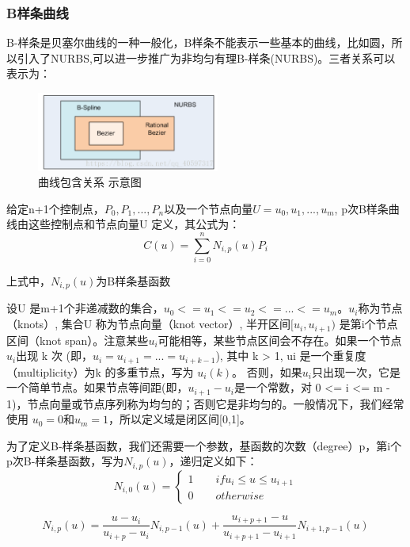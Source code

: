 \documentclass[a4paper,UTF8]{article}
\theoremstyle{definition}
\begin{document}
\subsubsection{B样条曲线}
B-样条是贝塞尔曲线的一种一般化，B样条不能表示一些基本的曲线，比如圆，所以引入了NURBS,可以进一步推广为非均匀有理B-样条(NURBS)。三者关系可以表示为：
\begin{figure}[ht]
\centering
\includegraphics[width=6cm]{x16.png}
\caption{曲线包含关系 示意图}
\label{x16}
\end{figure}
\par 给定n+1个控制点，$P_{0},P_{1}, ..., P_{n}以及一个节点向量U={u_{0},u_{1}, ..., u_{m}}$, p次B样条曲线由这些控制点和节点向量U 定义，其公式为：
\begin{equation}
C(u) = \sum_{i=0}^n N_{i,p}(u)P_{i}
\end{equation}
\par 上式中，$N_{i,p}(u)$为B样条基函数
\par 设U 是m+1个非递减数的集合，$u_{0}<=u_{1}<=u_{2}<= ... <= u_{m}。u_{i}$称为节点（knots）, 集合U 称为节点向量（knot vector）, 半开区间$[u_{i}, u_{i+1})$ 是第i个节点区间（knot span）。注意某些$u_{i}$可能相等，某些节点区间会不存在。如果一个节点$u_{i}$出现 k 次 (即，$u_{i} = u_{i+1} = ... = u_{i+k-1}$), 其中 k > 1, ui 是一个重复度（multiplicity）为k 的多重节点，写为 $u_{i}(k)$。 否则，如果$u_{i}$只出现一次，它是一个简单节点。如果节点等间距(即，$ u_{i+1} - u_{i} $是一个常数，对 0 <= i <= m - 1)，节点向量或节点序列称为均匀的；否则它是非均匀的。一般情况下，我们经常使用 $u_{0} = 0和 u_{m} = 1$，所以定义域是闭区间[0,1]。
\par 为了定义B-样条基函数，我们还需要一个参数，基函数的次数（degree）p，第i个p次B-样条基函数，写为$N_{i,p}(u)$，递归定义如下：
\begin{equation}
N_{i,0}(u)=
\left\{
\begin{aligned}
1 \qquad if u_{i} \leq u \leq u_{i+1} \\
0 \qquad otherwise
\end{aligned}
\right.
\end{equation}

\begin{equation}
N_{i,p}(u)= \frac{u-u_{i}}{u_{i+p}-u_{i}}N_{i,p-1}(u)+\frac{u_{i+p+1}-u}{u_{i+p+1}-u_{i+1}}N_{i+1,p-1}(u)
\end{equation}
\end{document}
